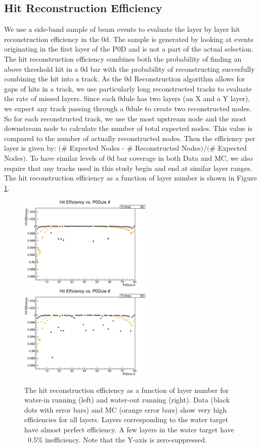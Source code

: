\subsection{Hit Reconstruction Efficiency}
\label{sec:Systematics_HitEfficiency}

We use a side-band sample of beam events to evaluate 
the layer by layer hit reconstruction efficiency in the \p0d. The sample is generated by looking at events originating in the first layer of the P0D and is not a part of the actual selection. 
The hit reconstruction efficiency combines both the probability of finding an above threshold hit 
in a \p0d bar with the probability of reconstructing succesfully combining 
the hit into a track. 
As the \p0d Reconstruction algorithm allows for gaps of hits in a track, 
we use particularly long reconstructed tracks to evaluate 
the rate of missed layers. 
Since each \p0dule has two layers (an X and a Y layer), 
we expect any track passing through a \p0dule to create 
two reconstructed nodes. 
So for each reconstructed track, we use the most upstream node 
and the most downstream node to calculate the number of total expected nodes. 
This value is compared to the number of actually reconstructed nodes. 
Then the efficiency per layer is given 
by: $($\# Expected Nodes - \# Reconstructed Nodes$)/($\# Expected Nodes$)$. 
To have similar levels of \p0d bar coverage in both Data and MC, 
we also require that any tracks used in this study begin and end at similar layer ranges. 
The hit reconstruction efficiency as a function of layer number 
is shown in Figure \ref{fig:hiteffsand}.

\begin{figure}
\centering
\includegraphics[width=2.5in]{Figures/Systematics/HitEfficiency/Hiteffsandw.eps}
\includegraphics[width=2.5in]{Figures/Systematics/HitEfficiency/Hiteffsanda.eps}
\caption{The hit reconstruction efficiency as a function of layer number for water-in running (left) and water-out running (right). Data (black dots with error bars) and MC (orange error bars) show very high efficiencies for all layers. Layers corresponding to the water target have almost perfect efficiency. A few layers in the water target have ~0.5\% inefficiency. Note that the Y-axis is zero-suppressed.}
\label{fig:hiteffsand}
\end{figure}

